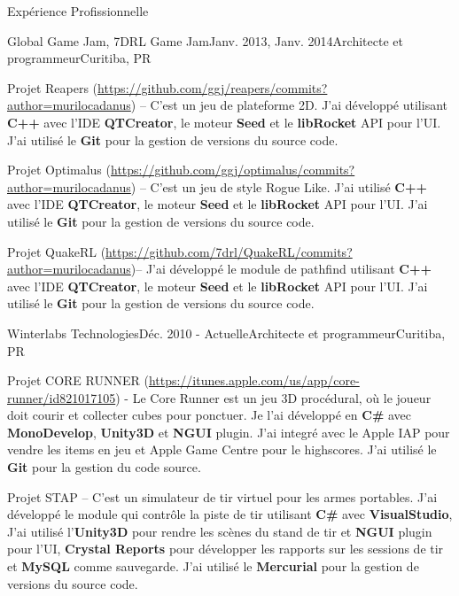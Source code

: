 \documentclass{resume}
\begin{document}
  \begin{rSection}{Expérience Profissionnelle}
    \begin{rSubsection}{Global Game Jam, 7DRL Game Jam}{Janv. 2013, Janv. 2014}{Architecte et programmeur}{Curitiba, PR}
    \item Projet Reapers (\url{https://github.com/ggj/reapers/commits?author=murilocadanus}) – C'est un jeu de plateforme 2D. J'ai développé utilisant \textbf{C++} avec l'IDE \textbf{QTCreator}, le moteur \textbf{Seed} et le \textbf{libRocket} API pour l'UI.  J'ai utilisé le \textbf{Git} pour la gestion de versions du source code. \\
    \item Projet Optimalus (\url{https://github.com/ggj/optimalus/commits?author=murilocadanus}) – C'est un jeu de style Rogue Like. J'ai utilisé \textbf{C++} avec l'IDE \textbf{QTCreator}, le moteur \textbf{Seed} et le \textbf{libRocket} API pour l'UI.  J'ai utilisé le \textbf{Git} pour la gestion de versions du source code. \\
    \item Projet QuakeRL (\url{https://github.com/7drl/QuakeRL/commits?author=murilocadanus})– J'ai développé le module de pathfind utilisant \textbf{C++} avec l'IDE \textbf{QTCreator}, le moteur \textbf{Seed} et le \textbf{libRocket} API pour l'UI.  J'ai utilisé le \textbf{Git} pour la gestion de versions du source code.
    \end{rSubsection}
    \begin{rSubsection}{Winterlabs Technologies}{Déc. 2010 - 
Actuelle}{Architecte et programmeur}{Curitiba, PR}
    \item Projet CORE RUNNER (\url{https://itunes.apple.com/us/app/core-runner/id821017105}) - Le Core Runner est un jeu 3D procédural, où le joueur doit courir et collecter cubes pour ponctuer. Je l'ai développé en \textbf{C\#} avec \textbf{MonoDevelop}, \textbf{Unity3D} et \textbf{NGUI} plugin. J'ai integré avec le Apple IAP pour vendre les items en jeu et Apple Game Centre pour le highscores. J'ai utilisé le \textbf{Git} pour la gestion du code source. \\
    \item Projet STAP – C'est un simulateur de tir virtuel pour les armes portables. J'ai développé le module qui contrôle la piste de tir utilisant \textbf{C\#} avec \textbf{VisualStudio}, J'ai utilisé l'\textbf{Unity3D} pour rendre les scènes du stand de tir et \textbf{NGUI} plugin pour l'UI, \textbf{Crystal Reports} pour développer les rapports sur les sessions de tir et \textbf{MySQL} comme sauvegarde.  J'ai utilisé le \textbf{Mercurial} pour la gestion de versions du source code. \\

\end{rSubsection}
\end{rSection}
\end{document}

